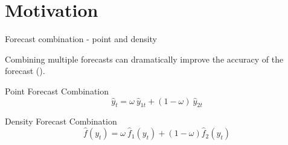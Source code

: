 \section{Motivation}

\logo{}

\begin{frame}{Forecast combination - point and density}

    Combining multiple forecasts can dramatically improve the accuracy of the forecast (\cite{BG69}).
    
    \vspace{5mm}

    
    Point Forecast Combination 
    \[\hat y_t = \omega \ \hat y_{1t} + (1-\omega) \ \hat y_{2t}\]

    Density Forecast Combination
    \[ \hat f(y_t) = \omega \ \hat f_1(y_t) + (1-\omega) \hat f_2(y_t)\]

\end{frame}


